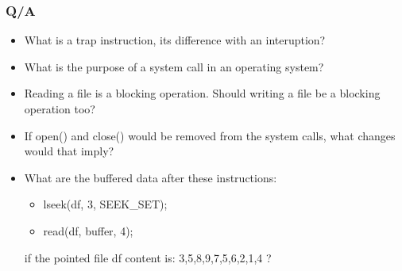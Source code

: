 \begin{frame}
  \frametitle{Q/A}
  \begin{itemize}
    \item What is a trap instruction, its difference with an interuption? %
    \item What is the purpose of a system call in an operating system? %
    \item Reading a file is a blocking operation. Should writing a file be a blocking operation too? %
    \item If {\scriptsize open()} and {\scriptsize close()} would be removed from the system calls, what changes would that imply?
    \item What are the buffered data after these instructions:
    \begin{itemize}
        \item lseek(df, 3, SEEK\_SET);
        \item read(df, buffer, 4);
   \end{itemize}
   if the pointed file df content is: 3,5,8,9,7,5,6,2,1,4 ?
  \end{itemize}
\end{frame}
